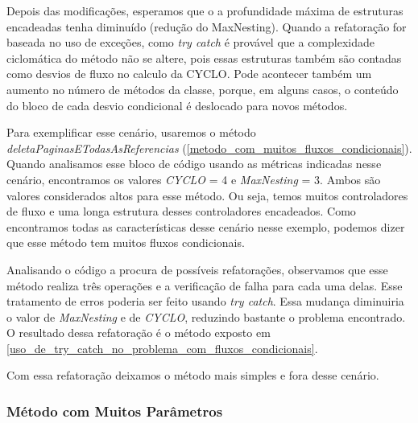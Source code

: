 	Depois das modificações, esperamos que o a profundidade máxima de estruturas encadeadas tenha diminuído (redução do MaxNesting). Quando a refatoração for baseada no uso de exceções, como \textit{try catch} é provável que a complexidade ciclomática do método não se altere, pois essas estruturas também são contadas como desvios de fluxo no calculo da CYCLO. Pode acontecer também um aumento no número de métodos da classe, porque, em alguns casos, o conteúdo do bloco de cada desvio condicional é deslocado para novos métodos. 
           
	Para exemplificar esse cenário, usaremos o método \textit{deletaPaginasETodasAsReferencias} (\ref{metodo_com_muitos_fluxos_condicionais}). Quando analisamos esse bloco de código usando as métricas indicadas nesse cenário, encontramos os valores \textit{CYCLO} = 4 e \textit{MaxNesting} = 3. Ambos são valores considerados altos para esse método. Ou seja, temos muitos controladores de fluxo e uma longa estrutura desses controladores encadeados. Como encontramos todas as características desse cenário nesse exemplo, podemos dizer que esse método tem muitos fluxos condicionais. 
	
               

	Analisando o código a procura de possíveis refatorações, observamos que esse método realiza três operações e a verificação de falha para cada uma delas. Esse tratamento de erros poderia ser feito usando \textit{try catch}. Essa mudança diminuiria o valor de \textit{MaxNesting} e de \textit{CYCLO}, reduzindo bastante o problema encontrado. O resultado dessa refatoração é o método exposto em \ref{uso_de_try_catch_no_problema_com_fluxos_condicionais}.
                                                         


	Com essa refatoração deixamos o método mais simples e fora desse cenário.


\subsubsection{Método com Muitos Parâmetros}

